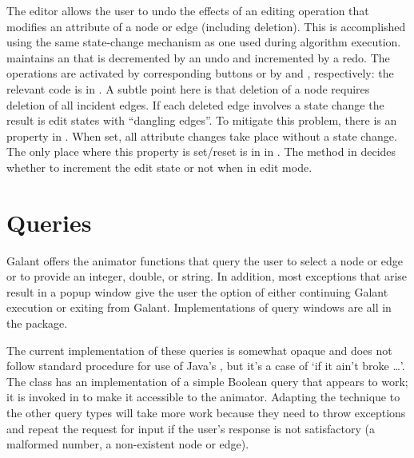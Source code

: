 The editor allows the user to undo the effects of an editing operation that
modifies an attribute of a node or edge (including deletion). This is
accomplished using the same state-change mechanism as one used during
algorithm execution.  maintains an  that
is decremented by an undo and incremented by a redo. The operations are
activated by corresponding buttons or by  and ,
respectively: the relevant code is in .
A subtle point here is that deletion of a node requires deletion of all
incident edges. If each deleted edge involves a state change the result is
edit states with ``dangling edges''. To mitigate this problem, there is an
 property in . When set, all attribute
changes take place without a state change. The only place where this property
is set/reset is in  in . The
 method in 
decides whether to increment the edit state or not when in edit mode.

\section{Queries} \label{sec:queries}

Galant offers the animator functions that query the user to select a node or
edge or to provide an integer, double, or string. In addition, most exceptions
that arise result in a popup window give the user the option of either
continuing Galant execution or exiting from Galant.
Implementations of query windows are all in the  package.

The current implementation of these queries is somewhat opaque and does not
follow standard procedure for use of Java's , but it's a
case of `if it ain't broke \ldots'.
The class  has an implementation of a simple
Boolean query that appears to work; it is invoked in  to make
it accessible to the animator.
Adapting the technique to the other query types will take more work because
they need to throw exceptions and repeat the request for input if the user's
response is not satisfactory (a malformed number, a non-existent node or edge).

